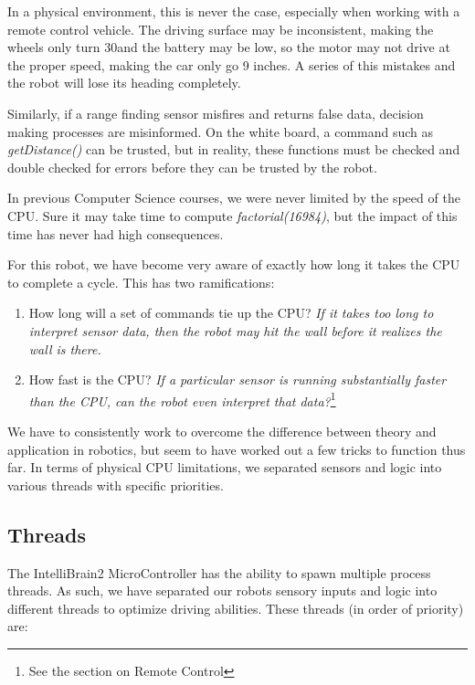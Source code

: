 \documentclass[12pt]{article}
\begin{document}
In a physical environment, this is never the case, especially when working with a remote control vehicle.  The driving surface may be inconsistent, making the wheels only turn 30\textdegree and the battery may be low, so the motor may not drive at the proper speed, making the car only go 9 inches.  A series of this mistakes and the robot will lose its heading completely.  

Similarly, if a range finding sensor misfires and returns false data, decision making processes are misinformed.  On the white board, a command such as \textit{getDistance()} can be trusted, but in reality, these functions must be checked and double checked for errors before they can be trusted by the robot.
\vspace{2mm}

In previous Computer Science courses, we were never limited by the speed of the CPU.  Sure it may take time to compute \textit{factorial(16984)}, but the impact of this time has never had high consequences.

For this robot, we have become very aware of exactly how long it takes the CPU to complete a cycle.  This has two ramifications:
\begin{enumerate}
\item How long will a set of commands tie up the CPU? \textit{If it takes too long to interpret sensor data, then the robot may hit the wall before it realizes the wall is there.}
\item How fast is the CPU? \textit{If a particular sensor is running substantially faster than the CPU, can the robot even interpret that data?}\footnote{See the section on Remote Control}
\end{enumerate}

\vspace{2mm}
We have to consistently work to overcome the difference between theory and application in robotics, but seem to have worked out a few tricks to function thus far.  In terms of physical CPU limitations, we separated sensors and logic into various threads with specific priorities.

\clearpage
\subsection{Threads}
The IntelliBrain2 MicroController has the ability to spawn multiple process threads.  As such, we have separated our robots sensory inputs and logic into different threads to optimize driving abilities.  These threads (in order of priority) are:
\end{document}
